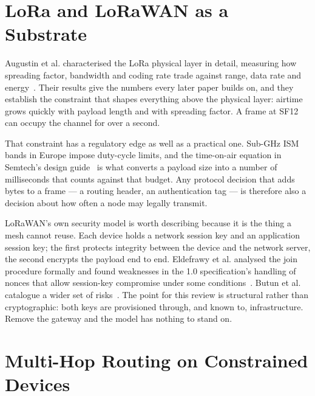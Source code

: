 \documentclass[conference]{IEEEtran}
\begin{document}
\section{LoRa and LoRaWAN as a Substrate}\label{sec:lora}

Augustin et al. characterised the LoRa physical layer in detail, measuring how
spreading factor, bandwidth and coding rate trade against range, data rate and
energy~\cite{augustin2016lora}. Their results give the numbers every later paper
builds on, and they establish the constraint that shapes everything above the
physical layer: airtime grows quickly with payload length and with spreading
factor. A frame at SF12 can occupy the channel for over a second.

That constraint has a regulatory edge as well as a practical one. Sub-GHz ISM
bands in Europe impose duty-cycle limits, and the time-on-air equation in
Semtech's design guide~\cite{semtech2013toa} is what converts a payload size into
a number of milliseconds that counts against that budget. Any protocol decision
that adds bytes to a frame — a routing header, an authentication tag — is
therefore also a decision about how often a node may legally transmit.

LoRaWAN's own security model is worth describing because it is the thing a mesh
cannot reuse. Each device holds a network session key and an application session
key; the first protects integrity between the device and the network server, the
second encrypts the payload end to end. Eldefrawy et al. analysed the join
procedure formally and found weaknesses in the 1.0 specification's handling of
nonces that allow session-key compromise under some
conditions~\cite{eldefrawy2019formal}. Butun et al. catalogue a wider set of
risks~\cite{butun2018lorawan}. The point for this review is structural rather
than cryptographic: both keys are provisioned through, and known to,
infrastructure. Remove the gateway and the model has nothing to stand on.

\section{Multi-Hop Routing on Constrained Devices}\label{sec:routing}
\end{document}
